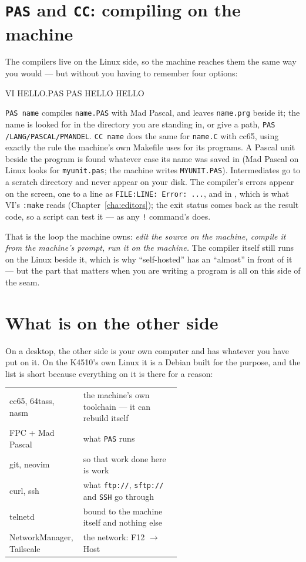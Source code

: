\section{\texttt{PAS} and \texttt{CC}: compiling on the machine}
The compilers live on the Linux side, so the machine reaches them the
same way you would --- but without you having to remember four options:

\begin{type}
VI HELLO.PAS
PAS HELLO
HELLO
\end{type}

\verb|PAS name| compiles \texttt{name.PAS} with Mad Pascal, and leaves
\texttt{name.prg} beside it; the name is looked for in the directory you
are standing in, or give a path, \verb|PAS /LANG/PASCAL/PMANDEL|.
\verb|CC name| does the same for \texttt{name.C} with cc65, using exactly
the rule the machine's own Makefile uses for its programs. A Pascal unit
beside the program is found whatever case its name was saved in (Mad
Pascal on Linux looks for \texttt{myunit.pas}; the machine writes
\texttt{MYUNIT.PAS}). Intermediates go to a scratch directory and never
appear on your disk. The compiler's errors appear on the screen, one to a
line as \texttt{FILE:LINE: Error: ...}, and in
, which is what VI's \verb|:make| reads
(Chapter~\ref{cha:editors}); the exit status comes back as the result
code, so a script can test it --- as any \verb|!| command's does.

That is the loop the machine owns: \emph{edit the source on the machine,
compile it from the machine's prompt, run it on the machine.} The
compiler itself still runs on the Linux beside it, which is why
``self-hosted'' has an ``almost'' in front of it --- but the part that
matters when you are writing a program is all on this side of the seam.

\section{What is on the other side}
On a desktop, the other side is your own computer and has whatever you
have put on it. On the K4510's own Linux it is a Debian built for the
purpose, and the list is short because everything on it is there for a
reason:

\begin{center}
\small
\begin{tabular}{@{}l >{\raggedright\arraybackslash}p{0.58\linewidth}@{}}
\toprule
cc65, 64tass, nasm & the machine's own toolchain --- it can rebuild itself \\
FPC + Mad Pascal & what \verb|PAS| runs \\
git, neovim & so that work done here is work \\
curl, ssh & what \texttt{ftp://}, \texttt{sftp://} and \verb|SSH| go through \\
telnetd & bound to the machine itself and nothing else \\
NetworkManager, Tailscale & the network: F12 $\rightarrow$ Host \\
\bottomrule
\end{tabular}
\end{center}

